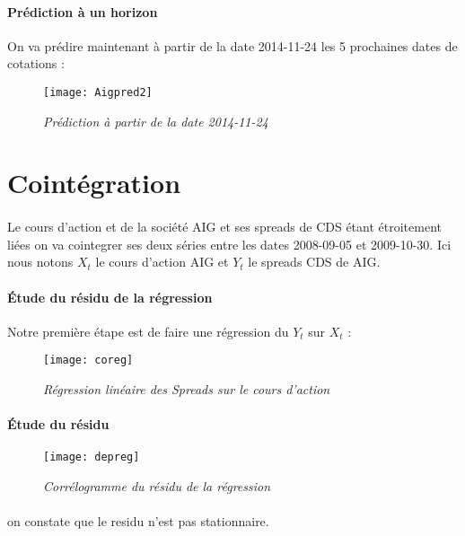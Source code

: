     \paragraph{Prédiction à un horizon} 
        On va prédire maintenant à partir de la date 2014-11-24 les 5 prochaines
        dates de cotations :
        \begin{figure}[H]
            \centering 
            \label{fig:Aigpred2} 
            \texttt{[image: Aigpred2]} 
            \caption{\it Prédiction à partir de la date 2014-11-24 } 
        \end{figure} 
        \section{Cointégration}
    \paragraph{} Le cours d'action et de la société AIG et ses spreads de CDS étant
    étroitement liées on va cointegrer ses deux séries entre les dates
    2008-09-05 et 2009-10-30. Ici nous notons $X_t$ le cours d'action AIG et
    $Y_t$ le spreads CDS de AIG.
    \paragraph{Étude du résidu de la régression} Notre première étape est de faire
    une régression du $Y_t$ sur $X_t$ :
    \begin{figure}[H]
        \centering 
        \label{fig:coreg} 
        \texttt{[image: coreg]} 
        \caption{\it Régression linéaire des Spreads sur le cours d'action } 
    \end{figure}
    \paragraph{Étude du résidu}
    \begin{figure}[H]
          \centering 
         \label{fig:depreg} 
          \texttt{[image: depreg]} 
          \caption{\it Corrélogramme du résidu de la régression } 
            \end{figure} 
             
            \paragraph{} on constate que le residu n'est pas stationnaire.

